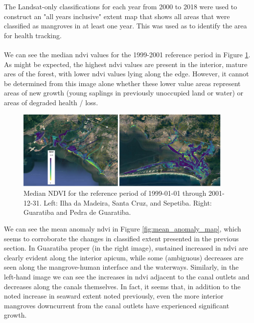 The Landsat-only classifications for each year from 2000 to 2018 were used to construct an "all years inclusive" extent map that shows all areas that were classified as mangroves in at least one year. This was used as to identify the area for health tracking.

\paragraph{} \leavevmode\newline

We can see the median \ac{ndvi} values for the 1999-2001 reference period in Figure \ref{fig:reference_median}. As might be expected, the highest \ac{ndvi} values are present in the interior, mature ares of the forest, with lower \ac{ndvi} values lying along the edge. However, it cannot be determined from this image alone whether these lower value areas represent areas of new growth (young saplings in previously unoccupied land or water) or areas of degraded health / loss.  

\begin{figure}[!htb] 
\centering
\includegraphics[width=0.95\textwidth]{Figures/chap4/reference_median.png}
\caption[Reference Median NDVI of Region]{Median NDVI for the reference period of 1999-01-01 through 2001-12-31. Left: Ilha da Madeira, Santa Cruz, and Sepetiba. Right: Guaratiba and Pedra de Guaratiba.}
\label{fig:reference_median}
\end{figure}

We can see the mean anomaly \ac{ndvi} in Figure \ref{fig:mean_anomaly_map}, which seems to corroborate the changes in classified extent presented in the previous section. In Guaratiba proper (in the right image), sustained increased in \ac{ndvi} are clearly evident along the interior apicum, while some (ambiguous) decreases are seen along the mangrove-human interface and the waterways. Similarly, in the left-hand image we can see the increases in \ac{ndvi} adjacent to the canal outlets and decreases along the canals themselves. In fact, it seems that, in addition to the noted increase in seaward extent noted previously, even the more interior mangroves downcurrent from the canal outlets have experienced significant growth. 

